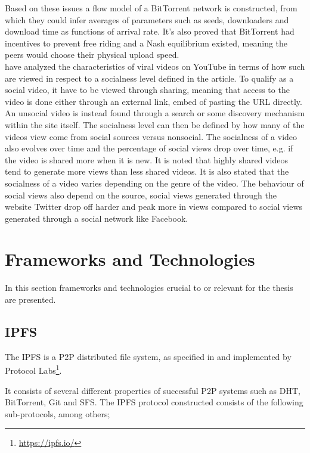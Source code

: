 Based on these issues a flow model of a BitTorrent network is constructed, from which they could infer averages of parameters such as seeds, downloaders and download time as functions of arrival rate. It's also proved that BitTorrent had incentives to prevent free riding and a Nash equilibrium existed, meaning the peers would choose their physical upload speed.
\\


\citet{broxton2013catching} have analyzed the characteristics of viral videos on YouTube in terms of how such are viewed in respect to a socialness level defined in the article. To qualify as a social video, it have to be viewed through sharing, meaning that access to the video is done either through an external link, embed of pasting the URL directly. An unsocial video is instead found through a search or some discovery mechanism within the site itself. The socialness level can then be defined by how many of the videos view come from social sources versus nonsocial. The socialness of a video also evolves over time and the percentage of social views drop over time, e.g. if the video is shared more when it is new. It is noted that highly shared videos tend to generate more views than less shared videos. It is also stated that the socialness of a video varies depending on the genre of the video. The behaviour of social views also depend on the source, social views generated through the website Twitter drop off harder and peak more in views compared to social views generated through a social network like Facebook.


\section{Frameworks and Technologies}
\label{sec:fram-techn}
In this section frameworks and technologies crucial to or relevant for the thesis are presented.

\subsection{\acl{IPFS}}
The \ac{IPFS} is a \ac{P2P} distributed file system, as specified in \citet{benet2014ipfs} and implemented by Protocol Labs\footnote{\url{https://ipfs.io/}}.

It consists of several different properties of successful \ac{P2P} systems such as \ac{DHT}, BitTorrent, Git and \ac{SFS}. The \ac{IPFS} protocol constructed consists of the following sub-protocols, among others;


